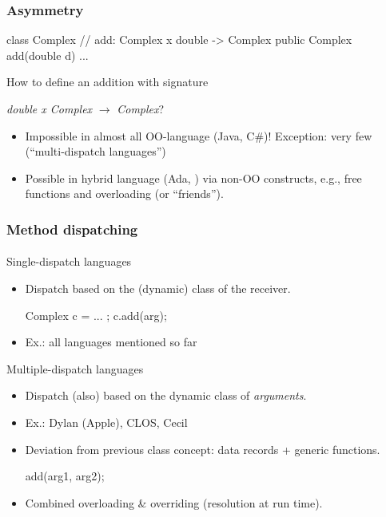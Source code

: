 \documentclass{beamer}
\begin{document}
\begin{frame}[fragile]
\frametitle{Asymmetry}
\begin{cplus3}
class Complex 
{
    // add: Complex x double -> Complex  
    public Complex add(double d) {...}
}
\end{cplus3}
How to define an addition with signature 
\begin{center}
\textit{double x Complex} $\rightarrow$ \textit{Complex}?
\end{center}

\begin{itemize}
\item Impossible in almost all OO-language (Java, C\#)!
Exception: very few (``multi-dispatch languages'') 
\item Possible in hybrid language (Ada, \Cpp) via non-OO constructs,
e.g., free functions and overloading (or ``friends''). 
\end{itemize}
\end{frame}

\begin{frame}[fragile]
\frametitle{Method dispatching}
\framesubtitle{}

Single-dispatch languages
\begin{itemize}
\item Dispatch based on the (dynamic) class of the receiver. 
\begin{cplus3}
     Complex c = ... ;   
     c.add(arg);
\end{cplus3}
\item Ex.: all languages mentioned so far

\end{itemize}

Multiple-dispatch languages
\begin{itemize}
\item Dispatch (also) based on the dynamic class of \textit{arguments}.
\item Ex.: Dylan (Apple), CLOS, Cecil
\item Deviation from previous class concept: data records + generic functions.
\begin{cplus3}
     add(arg1, arg2);
\end{cplus3}
\item Combined overloading \& overriding (resolution at run time).
\end{itemize} 
\end{frame}
\end{document}
